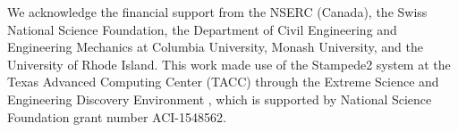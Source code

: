 \documentclass[gmd, manuscript]{copernicus}
\begin{document}












\begin{acknowledgements}
We acknowledge the financial support from the NSERC (Canada), the Swiss National Science Foundation, the Department of Civil Engineering and Engineering Mechanics at Columbia University, Monash University, and the University of Rhode Island.
This work made use of the Stampede2 system at the Texas Advanced Computing Center (TACC) through the Extreme Science and Engineering Discovery Environment \citep[XSEDE;][]{Towns+2014}, which is supported by National Science Foundation grant number ACI-1548562.
\end{acknowledgements}
\end{document}
